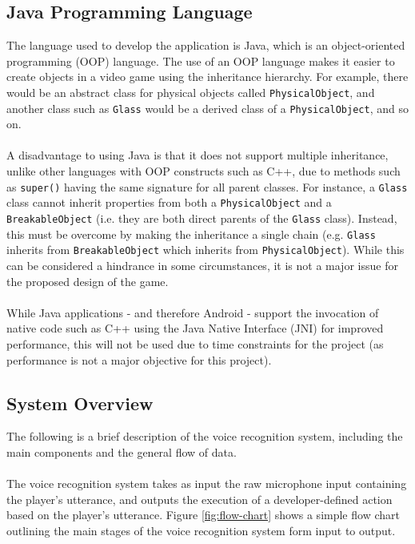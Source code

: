 \documentclass[12pt]{article}
\begin{document}
\subsection{Java Programming Language}

The language used to develop the application is Java, which is an object-oriented programming (OOP) language. The use of an OOP language makes it easier to create objects in a video game using the inheritance hierarchy. For example, there would be an abstract class for physical objects called \texttt{PhysicalObject}, and another class such as \texttt{Glass} would be a derived class of a \texttt{PhysicalObject}, and so on.
\\
\\
A disadvantage to using Java is that it does not support multiple inheritance, unlike other languages with OOP constructs such as C++, due to methods such as \texttt{super()} having the same signature for all parent classes. For instance, a \texttt{Glass} class cannot inherit properties from both a \texttt{PhysicalObject} and a \texttt{BreakableObject} (i.e. they are both direct parents of the \texttt{Glass} class). Instead, this must be overcome by making the inheritance a single chain (e.g. \texttt{Glass} inherits from \texttt{BreakableObject} which inherits from \texttt{PhysicalObject}). While this can be considered a hindrance in some circumstances, it is not a major issue for the proposed design of the game.
\\
\\
While Java applications - and therefore Android - support the invocation of native code such as C++ using the Java Native Interface (JNI) for improved performance, this will not be used due to time constraints for the project (as performance is not a major objective for this project).

\subsection{System Overview}

The following is a brief description of the voice recognition system, including the main components and the general flow of data.
\\
\\
The voice recognition system takes as input the raw microphone input containing the player's utterance, and outputs the execution of a developer-defined action based on the player's utterance. Figure \ref{fig:flow-chart} shows a simple flow chart outlining the main stages of the voice recognition system form input to output.
\end{document}
